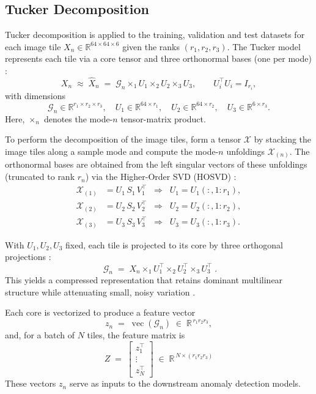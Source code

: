\documentclass[11pt]{article}
\begin{document}
\subsection{Tucker Decomposition}

Tucker decomposition is applied to the training, validation and test datasets for each image tile \(X_n \in \mathbb{R}^{64\times 64\times 6}\) given the ranks \((r_1,r_2,r_3)\).
The Tucker model represents each tile via a core tensor and three orthonormal bases (one per mode)
\citep{Tucker1966,KoldaBader2009}:
\[
X_n \;\approx\; \hat X_n \;=\; \mathcal{G}_n \times_{1} U_1 \times_{2} U_2 \times_{3} U_3,
\qquad U_i^\top U_i = I_{r_i},
\]
with dimensions
\[
\mathcal{G}_n \in \mathbb{R}^{r_1\times r_2\times r_3},\quad
U_1 \in \mathbb{R}^{64\times r_1},\quad
U_2 \in \mathbb{R}^{64\times r_2},\quad
U_3 \in \mathbb{R}^{6\times r_3}.
\]
Here, \(\times_n\) denotes the mode-\(n\) tensor-matrix product.

\noindent To perform the decomposition of the image tiles, form a tensor \(\mathcal{X}\) by stacking the image tiles along a sample mode and compute the mode-\(n\) unfoldings \(\mathcal{X}_{(n)}\).
The orthonormal bases are obtained from the left singular vectors of these unfoldings (truncated to rank \(r_n\)) via the
Higher-Order SVD (HOSVD) \citep{DeLathauwer2000a}:
\[
\begin{aligned}
\mathcal{X}_{(1)} &= U_1\,S_1\,V_1^\top \;\;\Rightarrow\;\; U_1 = U_1(:,1{:}r_1),\\[4pt]
\mathcal{X}_{(2)} &= U_2\,S_2\,V_2^\top \;\;\Rightarrow\;\; U_2 = U_2(:,1{:}r_2),\\[4pt]
\mathcal{X}_{(3)} &= U_3\,S_3\,V_3^\top \;\;\Rightarrow\;\; U_3 = U_3(:,1{:}r_3).
\end{aligned}
\]

\noindent With \(U_1,U_2,U_3\) fixed, each tile is projected to its core by three orthogonal projections
\citep{KoldaBader2009}:
\[
\boxed{\;\mathcal{G}_n \;=\; X_n \times_{1} U_1^{\top} \times_{2} U_2^{\top} \times_{3} U_3^{\top}\; }.
\]
This yields a compressed representation that retains dominant multilinear structure while attenuating small, noisy variation
\citep{KoldaBader2009}.

\noindent Each core is vectorized to produce a feature vector
\[
z_n \;=\; \operatorname{vec}(\mathcal{G}_n) \;\in\; \mathbb{R}^{\,r_1 r_2 r_3},
\]
and, for a batch of \(N\) tiles, the feature matrix is
\[
Z \;=\; \begin{bmatrix} z_1^\top \\ \vdots \\ z_N^\top \end{bmatrix}
\;\in\; \mathbb{R}^{\,N \times (r_1 r_2 r_3)}
\]
These vectors \(z_n\) serve as inputs to the downstream anomaly detection models.
\end{document}
